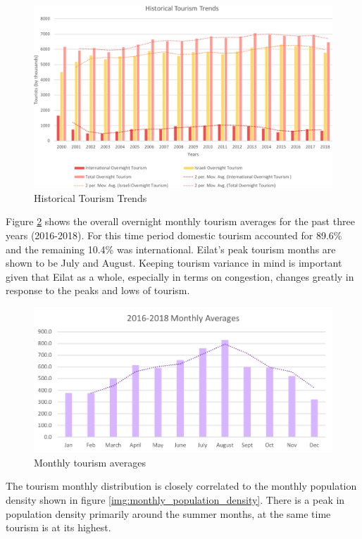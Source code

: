 \documentclass[12pt]{article}                               %
\begin{document}
\begin{figure}[H]
    \centering
    \includegraphics[width=1\textwidth]{images/historical_tourism_trends.png}
    \caption{Historical Tourism Trends}
    \label{img:historical_tourism_trends}
\end{figure}

Figure \ref{img:monthly_tourism} shows the overall overnight monthly tourism averages for the past three years (2016-2018). For this time period domestic tourism accounted for 89.6\% and the remaining 10.4\% was international. Eilat's peak tourism months are shown to be July and August. Keeping tourism variance in mind is important given that Eilat as a whole, especially in terms on congestion, changes greatly in response to the peaks and lows of tourism. 


\begin{figure}[H]
    \centering
    \includegraphics[width=1\textwidth]{images/monthy_tourism_averages.png}
    \caption{Monthly tourism averages}
    \label{img:monthly_tourism}
\end{figure}

The tourism monthly distribution is closely correlated to the monthly population density shown in figure \ref{img:monthly_population_density}. There is a peak in population density primarily around the summer months, at the same time tourism is at its highest.
\end{document}
